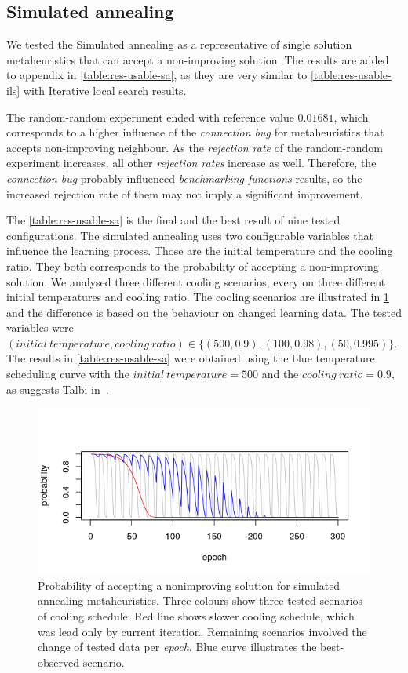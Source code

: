 \documentclass[
  print, %
  Table,   %
  nolof,     %
  nolot,     %
  11pt, %
  oneside  %
]{fithesis3}
\begin{document}
\subsection{Simulated annealing}
\label{subsec:res-ss-sa}

We tested the Simulated annealing as a representative of single solution metaheuristics that can accept a non-improving solution. The results are added to appendix in \cref{table:res-usable-sa}, as they are very similar to \cref{table:res-usable-ils} with Iterative local search results.

The random-random experiment ended with reference value $0.01681$, which corresponds to a higher influence of the \textit{connection bug} for metaheuristics that accepts non-improving neighbour. As the \textit{rejection rate} of the random-random experiment increases, all other \textit{rejection rates} increase as well. Therefore, the \textit{connection bug} probably influenced \textit{benchmarking functions} results, so the increased rejection rate of them may not imply a significant improvement.

The \cref{table:res-usable-sa} is the final and the best result of nine tested configurations. The simulated annealing uses two configurable variables that influence the learning process. Those are the initial temperature and the cooling ratio. They both corresponds to the probability of accepting a non-improving solution. We analysed three different cooling scenarios, every on three different initial temperatures and cooling ratio. The cooling scenarios are illustrated in \cref{fig:sa-cooling-scenarios} and the difference is based on the behaviour on changed learning data. The tested variables were $(\mathit{initial~temperature, cooling~ratio}) \in \{ (500, 0.9), (100, 0.98), (50, 0.995) \}$. The results in \cref{table:res-usable-sa} were obtained using the blue temperature scheduling curve with the $\mathit{initial~temperature} = 500$ and the $\mathit{cooling~ratio} = 0.9$, as suggests Talbi in~\cite{talbi2009metaheuristics}.

\begin{figure}
\centering
    \includegraphics[width=\textwidth]{./graphics/sa_prob.png}
    \caption{Probability of accepting a nonimproving solution for simulated annealing metaheuristics. Three colours show three tested scenarios of cooling schedule. Red line shows slower cooling schedule, which was lead only by current iteration. Remaining scenarios involved the change of tested data per \textit{epoch}. Blue curve illustrates the best-observed scenario.}
\label{fig:sa-cooling-scenarios}
\end{figure}
\end{document}
